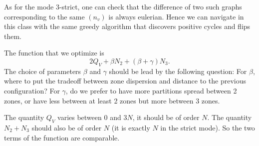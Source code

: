 \documentclass[]{article}
\begin{document}
As for the mode 3-strict, one can check that the difference of two such graphs corresponding to the same $(n_v)$ is always eulerian. Hence we can navigate in this class with the same greedy algorithm that discovers positive cycles and flips them.

The function that we optimize is 
$$
2Q_V +  \beta N_2 + (\beta+\gamma) N_3.
$$
The choice of parameters $\beta$ and $\gamma$ should be lead by the following question: For $\beta$, where to put the tradeoff between zone dispersion and distance to the previous configuration? For $\gamma$, do we prefer to have more partitions spread between 2 zones, or have less between at least 2 zones but more between 3 zones.

The quantity $Q_V$ varies between $0$ and $3N$, it should be of order $N$. The quantity $N_2+N_3$ should also be of order $N$ (it is exactly $N$ in the strict mode). So the two terms of the function are comparable. 


 

\end{document}
